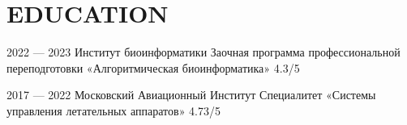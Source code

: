 \section{EDUCATION}

    \learn
    {2022 --- 2023}
    {Институт биоинформатики}
    {Заочная программа профессиональной переподготовки}
    {«Алгоритмическая биоинформатика»}
    {4.3/5}
    
    \learn
    {2017 — 2022}
    {Московский Авиационный Институт}
    {Специалитет}
    {«Системы управления летательных аппаратов»}
    {4.73/5}
